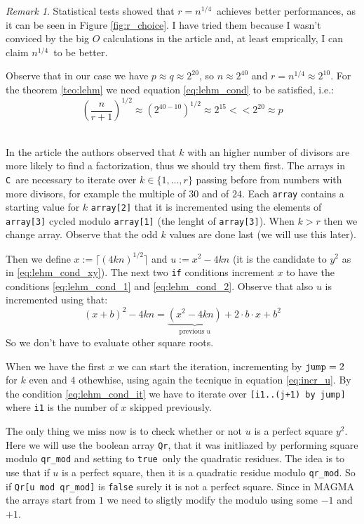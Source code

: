 \documentclass{article}
\theoremstyle{plain}
\theoremstyle{remark}
\newtheorem{rem}{Remark}
\theoremstyle{definition}
\begin{document}
\begin{rem}
	Statistical tests showed that $r = n^{1/4}$ achieves better performances, as it can be seen in Figure \ref{fig:r_choice}. I have tried them because I wasn't conviced by the big $O$ calculations in the article and, at least emprically, I can claim $n^{1/4}$ to be better. 

	Observe that in our case we have $p \approx q \approx 2^{20}$, so $n\approx 2^{40}$ and $r = n^{1/4} \approx 2^{10}$. For the theorem \ref{teo:lehm} we need equation \ref{eq:lehm_cond} to be satisfied, i.e.:
	\begin{equation*}
		\left(\frac{n}{r+1}\right)^{1/2} \approx \left( 2^{40-10} \right)^{1/2} \approx 2^{15} << 2^{20} \approx p
	\end{equation*} 
\end{rem}

In the article the authors observed that $k$ with an higher number of divisors are more likely to find a factorization, thus we should try them first. 
The arrays in \texttt{C} are necessary to iterate over $k \in \{1,...,r\}$ passing before from numbers with more divisors, for example the multiple of $30$ and of $24$. Each \verb|array| contains a starting value for $k$ \verb|array[2]| that it is incremented using the elements of \verb|array[3]| cycled modulo \verb|array[1]| (the lenght of \verb|array[3]|). When $k > r$ then we change array. Observe that the odd $k$ values are done last (we will use this later). 

Then we define $x := \lceil (4kn)^{1/2}\rceil $ and $ u := x^2 - 4kn$ (it is the candidate to $y^2$ as in \ref{eq:lehm_cond_xy}). The next two \texttt{if} conditions increment $x$ to have the conditions \ref{eq:lehm_cond_1} and \ref{eq:lehm_cond_2}. Observe that also $u$ is incremented using that:
\begin{equation}
	\label{eq:incr_u}
	(x+b)^2 - 4kn = \underbrace{(x^2 - 4kn)}_{\text{previous }u} + 2\cdot b \cdot x + b^2
\end{equation}
So we don't have to evaluate other square roots. 

When we have the first $x$ we can start the iteration, incrementing by $\verb|jump| = 2$ for $k$ even and $4$ othewhise, using again the tecnique in equation \ref{eq:incr_u}. By the condition \ref{eq:lehm_cond_it} we have to iterate over \verb|[i1..(j+1) by jump]| where \verb|i1| is the number of $x$ skipped previously. 

The only thing we miss now is to check whether or not $u$ is a perfect square $y^2$. Here we will use the boolean array \texttt{Qr}, 
that it was initliazed by performing square modulo \verb|qr_mod| and setting to \texttt{true} only the quadratic residues. 
The idea is to use that if $u$ is a perfect square, then it is a quadratic residue modulo \verb|qr_mod|. 
So if \verb|Qr[u mod qr_mod]| is \texttt{false} surely it is not a perfect square. 
Since in MAGMA the arrays start from $1$ we need to sligtly modify the modulo using some $-1$ and $+1$. 
\end{document}
